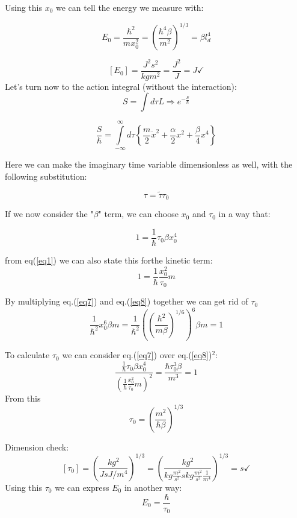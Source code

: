 \documentclass[12pt,a4paper]{article}
\numberwithin{equation}{section}
\begin{document}
Using this $x_0$ we can tell the energy we measure with:

\begin{equation}
E_0 = \frac{\hbar^2}{m x_0^2} = \left(\frac{\hbar^4 \beta}{m^2}\right)^{1/3} = \beta l_d^4
\end{equation}


\[
[E_0] = \frac{J^2 s^2}{kg m^2} = \frac{J^2}{J} = J \checkmark
\]
Let's turn now to the action integral (without the interaction):
\[
S = \int d\tau L \Rightarrow e^{-\frac{S}{\hbar}}
\]

\begin{equation}
\frac{S}{\hbar} = \int\limits_{-\infty}^\infty d\tau \left\lbrace \frac{m}{2} \dot{x}^2 + \frac{\alpha}{2} x^2 + \frac{\beta}{4} x^4   \right\rbrace
\end{equation}

Here we can make the imaginary time variable dimensionless as well, with the following substitution:

\[
\tau = \tilde{\tau} \tau_0
\]

If we now consider the "$\beta $" term, we can choose $x_0$ and $\tau_0$ in a way that:

\begin{equation}\label{eq7}
1 = \frac{1}{\hbar} \tau_0 \beta x_0^4
\end{equation}

from eq(\ref{eq1}) we can also state this forthe kinetic term:
\begin{equation}\label{eq8}
1 = \frac{1}{\hbar} \frac{x_0^2}{\tau_0} m 
\end{equation} 

By multiplying eq.(\ref{eq7}) and eq.(\ref{eq8}) together we can get rid of $\tau_0$ 
\[
\frac{1}{\hbar^2} x_0^6 \beta m = \frac{1}{\hbar^2} \left( \left( \frac{\hbar^2}{m \beta} \right)^{1/6} \right)^6 \beta m = 1
\]

To calculate $\tau_0$ we can consider eq.(\ref{eq7}) over eq.(\ref{eq8})$^2$:
\begin{equation}
\frac{\frac{1}{\hbar} \tau_0 \beta x_0^4}{\left(\frac{1}{\hbar} \frac{x_0^2}{\tau_0} m \right) ^2} = \frac{\hbar \tau_0^3 \beta}{m^3} = 1
\end{equation}
From this 
\begin{equation}
\tau_0 = \left( \frac{m^2}{\hbar \beta} \right)^{1/3}
\end{equation}

Dimension check:
\[
[\tau_0] = \left( \frac{kg^2}{J s J/m^4} \right)^{1/3} = \left( \frac{kg^2}{kg \frac{m^2}{s^2} s kg \frac{m^2}{s^2}\frac{1}{m^4}}\right)^{1/3} = s \checkmark
\]
Using this $\tau_0$ we can express $E_0$ in another way:
\begin{equation}
E_0 = \frac{\hbar}{\tau_0}
\end{equation}
\end{document}
